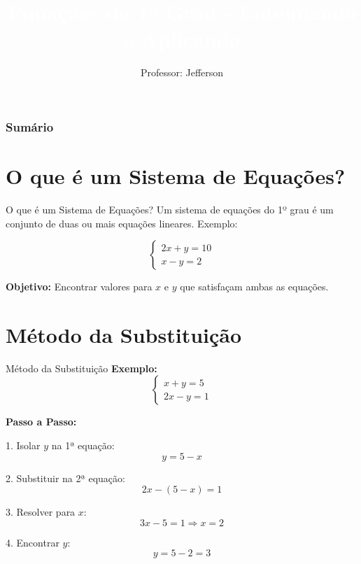 \documentclass[12pt]{beamer}
\title{\textcolor{white}{Equações do 1º Grau - Entendendo e Aplicando}}
\author{Professor: Jefferson}
\date{}
\begin{document}
\frame{\titlepage}

\begin{frame}
    \frametitle{Sumário}
    \tableofcontents
\end{frame}



\begin{frame}
\titlepage
\end{frame}

\section{O que é um Sistema de Equações?}
\begin{frame}{O que é um Sistema de Equações?}
Um sistema de equações do 1º grau é um conjunto de duas ou mais equações lineares. Exemplo:

\[
\begin{cases}
2x + y = 10 \\
x - y = 2
\end{cases}
\]

\textbf{Objetivo:} Encontrar valores para \(x\) e \(y\) que satisfaçam ambas as equações.
\end{frame}

\section{Método da Substituição}
\begin{frame}{Método da Substituição}
\textbf{Exemplo:}
\[
\begin{cases}
x + y = 5 \\
2x - y = 1
\end{cases}
\]

\textbf{Passo a Passo:}

1. Isolar \(y\) na 1ª equação:
\[
y = 5 - x
\]

2. Substituir na 2ª equação:
\[
2x - (5 - x) = 1
\]

3. Resolver para \(x\):
\[
3x - 5 = 1 \Rightarrow x = 2
\]

4. Encontrar \(y\):
\[
y = 5 - 2 = 3
\]
\end{frame}

\end{document}
